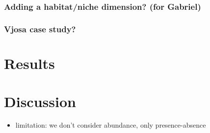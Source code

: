 \subsubsection{Adding a habitat/niche dimension? (for Gabriel)}

\subsubsection{Vjosa case study?}

\section{Results}

\section{Discussion}

\begin{itemize}
	\item limitation: we don't consider abundance, only presence-absence
\end{itemize}

\printbibliography

